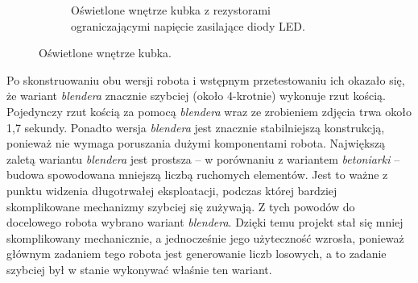 \begin{figure}[H]
\begin{subfigure}{0.48\textwidth}
        \caption{\label{fig:w sam raz}Oświetlone wnętrze kubka z rezystorami ograniczającymi napięcie zasilające diody LED.}
    \end{subfigure}
    \caption{\label{fig:oswietlone}Oświetlone wnętrze kubka.}
\end{figure}

Po skonstruowaniu obu wersji robota i wstępnym przetestowaniu ich okazało się, że wariant \textit{blendera} znacznie szybciej (około 4-krotnie) wykonuje rzut kością.
Pojedynczy rzut kością za pomocą \textit{blendera} wraz ze zrobieniem zdjęcia trwa około 1,7 sekundy.
Ponadto wersja \textit{blendera} jest znacznie stabilniejszą konstrukcją, ponieważ nie wymaga poruszania dużymi komponentami robota. 
Największą zaletą wariantu \textit{blendera} jest prostsza -- w porównaniu z wariantem \textit{betoniarki} -- budowa spowodowana mniejszą liczbą ruchomych elementów. Jest to ważne z punktu widzenia
długotrwałej eksploatacji, podczas której bardziej skomplikowane mechanizmy szybciej się zużywają. Z tych powodów do docelowego robota wybrano
wariant \textit{blendera}. Dzięki temu projekt stał się mniej skomplikowany mechanicznie, a jednocześnie jego użyteczność wzrosła, ponieważ
głównym zadaniem tego robota jest generowanie liczb losowych, a to zadanie szybciej był w stanie wykonywać właśnie ten wariant.


